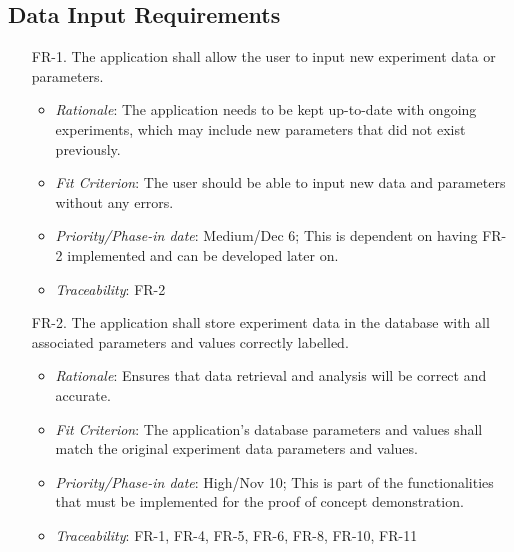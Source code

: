 \documentclass[12pt]{article}
\begin{document}
\subsection{Data Input Requirements}
  \begin{enumerate}
    \item[FR-1.] The application shall allow the user to input new experiment data or parameters.
    \begin{itemize}
    \item \textit{Rationale}: The application needs to be kept up-to-date with ongoing experiments, which may include new parameters that did not exist previously.
    \item \textit{Fit Criterion}: The user should be able to input new data and parameters without any errors.
    \item \textit{Priority/Phase-in date}: Medium/Dec 6; This is dependent on having FR-2 implemented and can be developed later on.
    \item \textit{Traceability}: FR-2
    \end{itemize}
    \item[FR-2.] The application shall store experiment data in the database with all associated parameters and values correctly labelled.
    \begin{itemize}
      \item \textit{Rationale}: Ensures that data retrieval and analysis will be correct and accurate.
      \item \textit{Fit Criterion}: The application's database parameters and values shall match the original experiment data parameters and values.
      \item \textit{Priority/Phase-in date}: High/Nov 10; This is part of the functionalities that must be implemented for the proof of concept demonstration.
      \item \textit{Traceability}: FR-1, FR-4, FR-5, FR-6, FR-8, FR-10, FR-11
    \end{itemize}
  \end{enumerate}
\end{document}
